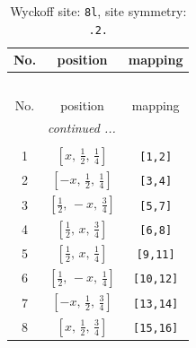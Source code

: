 \documentclass[fleqn,8pt]{jsarticle}
\begin{document}
\begin{longtable}{ccc}
\caption{Wyckoff site: {\tt 8l}, site symmetry: {\tt .2.}}
 \\
 \hline \hline
No. & position & mapping \\ \hline \endfirsthead

\multicolumn{2}{l}{\tablename\ \thetable{}} \\
 \hline \hline
No. & position & mapping \\ \hline \endhead

 \hline \hline
\multicolumn{2}{r}{\footnotesize\it continued ...} \\ \endfoot

 \hline \hline
\multicolumn{2}{r}{} \\ \endlastfoot

1 & $\left[ x,\, \frac{1}{2},\, \frac{1}{4} \right]$ & {\tt [1,2]} \\ \hline
2 & $\left[ - x,\, \frac{1}{2},\, \frac{1}{4} \right]$ & {\tt [3,4]} \\ \hline
3 & $\left[ \frac{1}{2},\, - x,\, \frac{3}{4} \right]$ & {\tt [5,7]} \\ \hline
4 & $\left[ \frac{1}{2},\, x,\, \frac{3}{4} \right]$ & {\tt [6,8]} \\ \hline
5 & $\left[ \frac{1}{2},\, x,\, \frac{1}{4} \right]$ & {\tt [9,11]} \\ \hline
6 & $\left[ \frac{1}{2},\, - x,\, \frac{1}{4} \right]$ & {\tt [10,12]} \\ \hline
7 & $\left[ - x,\, \frac{1}{2},\, \frac{3}{4} \right]$ & {\tt [13,14]} \\ \hline
8 & $\left[ x,\, \frac{1}{2},\, \frac{3}{4} \right]$ & {\tt [15,16]} \\
\end{longtable}
\renewcommand{\arraystretch}{1.2}
\end{document}

